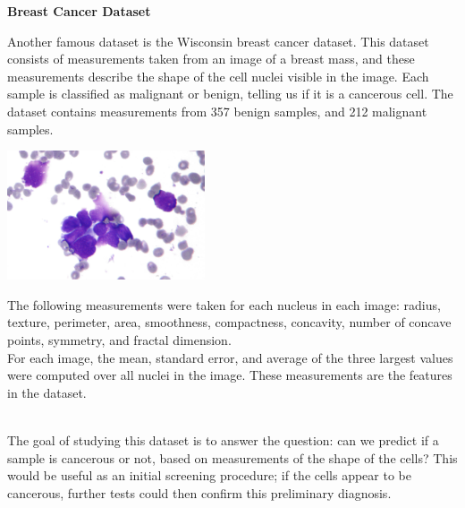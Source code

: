 \documentclass[10pt]{article}
\begin{document}
\vfill

\begin{center}{ \large \textbf{Breast Cancer Dataset} }\end{center}

Another famous dataset is the Wisconsin breast cancer dataset. This dataset consists of measurements taken from an image of a breast mass, and these measurements describe the shape of the cell nuclei visible in the image. Each sample is classified as malignant or benign, telling us if it is a cancerous cell. The dataset contains measurements from 357 benign samples, and 212 malignant samples. \\

\begin{minipage}{.5\textwidth}
\begin{center}
\includegraphics[height = 1.5in]{dataset-original}
\end{center}
\end{minipage}
\begin{minipage}{.5\textwidth}
The following measurements were taken for each nucleus in each image: radius, texture, perimeter, area, smoothness, compactness, concavity, number of concave points, symmetry, and fractal dimension.\\

For each image, the mean, standard error, and average of the three largest values were computed over all nuclei in the image. These measurements are the features in the dataset.
\end{minipage}\\

The goal of studying this dataset is to answer the question: can we predict if a sample is cancerous or not, based on measurements of the shape of the cells? This would be useful as an initial screening procedure; if the cells appear to be cancerous, further tests could then confirm this preliminary diagnosis.
\vfill
\end{document}
